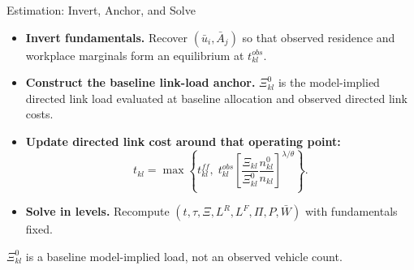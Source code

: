\documentclass[11pt,aspectratio=169]{beamer}
\begin{document}
\begin{frame}{Estimation: Invert, Anchor, and Solve}
\begin{itemize}\small
  \item \textbf{Invert fundamentals.} Recover $(\bar u_i,\bar A_j)$ so that observed residence and workplace marginals form an equilibrium at $t_{kl}^{obs}$.
  \item \textbf{Construct the baseline link-load anchor.} $\Xi_{kl}^{0}$ is the model-implied directed link load evaluated at baseline allocation and observed directed link costs.
  \item \textbf{Update directed link cost around that operating point:}
  \vspace{-0.45em}\begin{equation}\label{eq:anchor}
    t_{kl}=\max\!\left\{
    t_{kl}^{ff},\;
    t_{kl}^{obs}
    \left[
    \frac{\Xi_{kl}}{\Xi_{kl}^{0}}
    \frac{n_{kl}^{0}}{n_{kl}}
    \right]^{\lambda/\theta}
    \right\}.
  \end{equation}
  \vspace{-0.65em}
  \item \textbf{Solve in levels.} Recompute $(t,\tau,\Xi,L^R,L^F,\Pi,P,\bar W)$ with fundamentals fixed.
\end{itemize}
\vspace{-0.25em}
\begin{center}\footnotesize
$\Xi_{kl}^{0}$ is a baseline model-implied load, not an observed vehicle count.
\end{center}
\end{frame}
\end{document}

